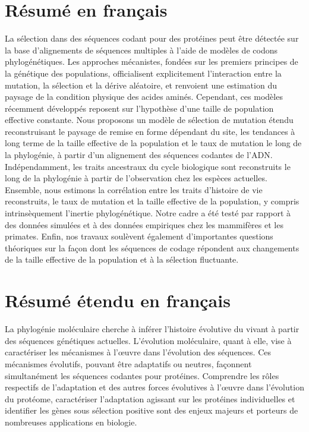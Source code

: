 \thispagestyle{empty}

\section*{Résumé en français}

La sélection dans des séquences codant pour des protéines peut être détectée sur la base d'alignements de séquences multiples à l'aide de modèles de codons phylogénétiques.
Les approches mécanistes, fondées sur les premiers principes de la génétique des populations, officialisent explicitement l'interaction entre la mutation, la sélection et la dérive aléatoire, et renvoient une estimation du paysage de la condition physique des acides aminés.
Cependant, ces modèles récemment développés reposent sur l'hypothèse d'une taille de population effective constante.
Nous proposons un modèle de sélection de mutation étendu reconstruisant le paysage de remise en forme dépendant du site, les tendances à long terme de la taille effective de la population et le taux de mutation le long de la phylogénie, à partir d'un alignement des séquences codantes de l'ADN.
Indépendamment, les traits ancestraux du cycle biologique sont reconstruits le long de la phylogénie à partir de l'observation chez les espèces actuelles.
Ensemble, nous estimons la corrélation entre les traits d'histoire de vie reconstruits, le taux de mutation et la taille effective de la population, y compris intrinsèquement l'inertie phylogénétique.
Notre cadre a été testé par rapport à des données simulées et à des données empiriques chez les mammifères et les primates.
Enfin, nos travaux soulèvent également d'importantes questions théoriques sur la façon dont les séquences de codage répondent aux changements de la taille effective de la population et à la sélection fluctuante.

\section*{Résumé étendu en français}

La phylogénie moléculaire cherche à inférer l’histoire évolutive du vivant à partir des séquences génétiques actuelles.
L'évolution moléculaire, quant à elle, vise à caractériser les mécanismes à l’œuvre dans l'évolution des séquences.
Ces mécanismes évolutifs, pouvant être adaptatifs ou neutres, façonnent simultanément les séquences codantes pour protéines.
Comprendre les rôles respectifs de l'adaptation et des autres forces évolutives à l’œuvre dans l'évolution du protéome, caractériser l'adaptation agissant sur les protéines individuelles et identifier les gènes sous sélection positive sont des enjeux majeurs et porteurs de nombreuses applications en biologie. \\

